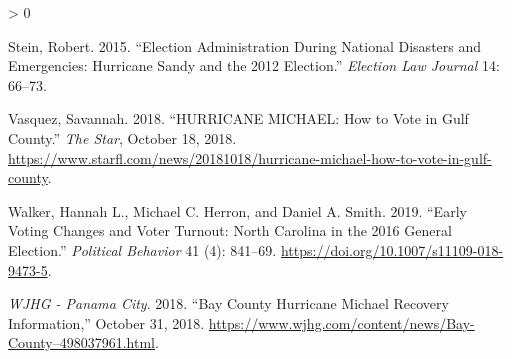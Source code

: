 \documentclass[
  12pt,
]{article}
\newlength{\cslhangindent}
\newenvironment{CSLReferences}[2] %
 {%
  \setlength{\parindent}{0pt}
  \ifodd #1 \everypar{\setlength{\hangindent}{\cslhangindent}}\ignorespaces\fi
  \ifnum #2 > 0
  \setlength{\parskip}{#2\baselineskip}
  \fi
 }%
 {}
\begin{document}
\begin{CSLReferences}{1}{0}
\leavevmode\hypertarget{ref-Stein2015}{}%
Stein, Robert. 2015. {``Election {Administration During National Disasters} and {Emergencies}: {Hurricane Sandy} and the 2012 {Election}.''} \emph{Election Law Journal} 14: 66--73.

\leavevmode\hypertarget{ref-Vasquez2018}{}%
Vasquez, Savannah. 2018. {``{HURRICANE MICHAEL}: {How} to Vote in {Gulf County}.''} \emph{The Star}, October 18, 2018. \url{https://www.starfl.com/news/20181018/hurricane-michael-how-to-vote-in-gulf-county}.

\leavevmode\hypertarget{ref-Walker2019}{}%
Walker, Hannah L., Michael C. Herron, and Daniel A. Smith. 2019. {``Early {Voting Changes} and {Voter Turnout}: {North Carolina} in the 2016 {General Election}.''} \emph{Political Behavior} 41 (4): 841--69. \url{https://doi.org/10.1007/s11109-018-9473-5}.

\leavevmode\hypertarget{ref-WJHG2018}{}%
\emph{WJHG - Panama City}. 2018. {``Bay {County Hurricane Michael Recovery Information},''} October 31, 2018. \url{https://www.wjhg.com/content/news/Bay-County–498037961.html}.

\end{CSLReferences}
\end{document}
